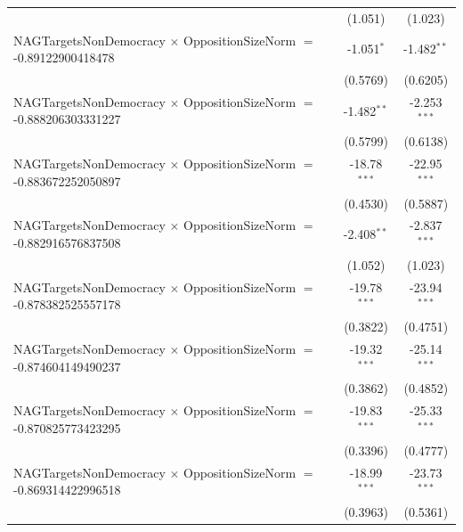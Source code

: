 \begin{tabular}{lcc}
                                                                                & (1.051)              & (1.023)\\   
   NAGTargetsNonDemocracy $\times$ OppositionSizeNorm $=$ -0.89122900418478     & -1.051$^{*}$         & -1.482$^{**}$\\   
                                                                                & (0.5769)             & (0.6205)\\   
   NAGTargetsNonDemocracy $\times$ OppositionSizeNorm $=$ -0.888206303331227    & -1.482$^{**}$        & -2.253$^{***}$\\   
                                                                                & (0.5799)             & (0.6138)\\   
   NAGTargetsNonDemocracy $\times$ OppositionSizeNorm $=$ -0.883672252050897    & -18.78$^{***}$       & -22.95$^{***}$\\   
                                                                                & (0.4530)             & (0.5887)\\   
   NAGTargetsNonDemocracy $\times$ OppositionSizeNorm $=$ -0.882916576837508    & -2.408$^{**}$        & -2.837$^{***}$\\   
                                                                                & (1.052)              & (1.023)\\   
   NAGTargetsNonDemocracy $\times$ OppositionSizeNorm $=$ -0.878382525557178    & -19.78$^{***}$       & -23.94$^{***}$\\   
                                                                                & (0.3822)             & (0.4751)\\   
   NAGTargetsNonDemocracy $\times$ OppositionSizeNorm $=$ -0.874604149490237    & -19.32$^{***}$       & -25.14$^{***}$\\   
                                                                                & (0.3862)             & (0.4852)\\   
   NAGTargetsNonDemocracy $\times$ OppositionSizeNorm $=$ -0.870825773423295    & -19.83$^{***}$       & -25.33$^{***}$\\   
                                                                                & (0.3396)             & (0.4777)\\   
   NAGTargetsNonDemocracy $\times$ OppositionSizeNorm $=$ -0.869314422996518    & -18.99$^{***}$       & -23.73$^{***}$\\   
                                                                                & (0.3963)             & (0.5361)\\   

\end{tabular}
